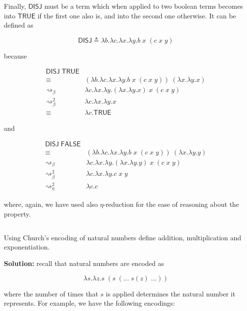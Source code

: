 \documentclass{article}
\begin{document}
Finally, $\mathsf{DISJ}$ must be a term which when applied 
to two boolean terms becomes into $\mathsf{TRUE}$ if the 
first one also is, and into the second one otherwise.
It can be defined as 

$$
\mathsf{DISJ} 
  \triangleq \lambda b.\lambda c.\lambda x.\lambda y. 
    b\;x\;(c\;x\;y)
$$

because

\begin{align*}
  \mathsf{DISJ}\;\mathsf{TRUE} & \\
    \equiv&
      (\lambda b.\lambda c.\lambda x.\lambda y.b\;x\;(c\;x\;y))\;
      (\lambda x.\lambda y.x) \\
    \rightsquigarrow_\beta&
      \lambda c.\lambda x.\lambda y.
        (\lambda x.\lambda y.x)\;x\;(c\;x\;y) \\
    \rightsquigarrow_\beta^2&
      \lambda c.\lambda x.\lambda y.x \\
    \equiv&
      \lambda c.\mathsf{TRUE}
\end{align*}

and 

\begin{align*}
  \mathsf{DISJ}\;\mathsf{FALSE} & \\
    \equiv&
      (\lambda b.\lambda c.\lambda x.\lambda y.b\;x\;(c\;x\;y))\;
      (\lambda x.\lambda y.y) \\
    \rightsquigarrow_\beta&
      \lambda c.\lambda x.\lambda y.
        (\lambda x.\lambda y.y)\;x\;(c\;x\;y) \\
    \rightsquigarrow_\beta^2&
      \lambda c.\lambda x.\lambda y.c\;x\;y \\
    \rightsquigarrow_\eta^2&
      \lambda c.c
\end{align*}

where, again, we have used also $\eta$-reduction for the 
ease of reasoning about the property.

\subsection{}\label{ex:7}

Using Church’s encoding of natural numbers define addition, 
multiplication and exponentiation.

\textbf{Solution:} recall that natural numbers are encoded as

$$
  \lambda s.\lambda z.
    s\;(s\;(...\;s(z)\;...))
$$

where the number of times that $s$ is applied determines the 
natural number it represents. For example, we have the following 
encodings:
\end{document}
